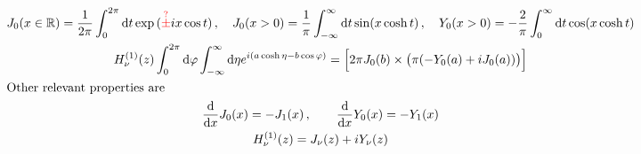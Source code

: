 \begin{subequations}
    \begin{gather}
        J_0(x\in\mathbb{R})=\frac{1}{2\pi}\int_0^{2\pi}\text{d} t\exp{(\textcolor{red}{\overset{?}{\pm}}{i}x\cos t)}\,,\quad
        J_0(x>0)=\frac{1}{\pi}\int_{-\infty}^\infty\text{d} t\sin(x\cosh t)\,,\quad Y_0(x>0)=-\frac{2}{\pi}\int_0^\infty\text{d} t\cos(x\cosh t)\\
        H_\nu^{(1)}(z)
        \int_0^{2\pi}\text{d}\varphi\int_{-\infty}^\infty\text{d}\eta e^{{i}(a\cosh\eta-b\cos\varphi)}=\Big[2\pi J_0(b)\times\big(\pi(-Y_0(a)+{i} J_0(a))\big)\Big]\\
        \intertext{Other relevant properties are}
        \frac{\text{d}}{\text{d} x}J_0(x)=-J_1(x)\,,\qquad\frac{\text{d}}{\text{d} x}Y_0(x)=-Y_1(x)\\
        H_\nu^{(1)}(z)=J_\nu(z)+{i} Y_\nu(z)
        \label{eq:BesselFunctions}
    \end{gather}
\end{subequations}




